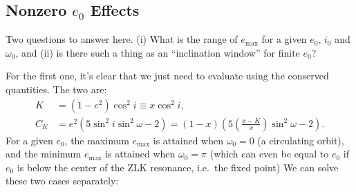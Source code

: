 \documentclass[12pt]{article}
\newcommand*{\p}[1]{\left(#1\right)}
\begin{document}
\subsection{Nonzero $e_0$ Effects}

Two questions to answer here. (i) What is the range of $e_{\max}$ for a given
$e_0$, $i_0$ and $\omega_0$, and (ii) is there such a thing as an ``inclination
window'' for finite $e_0$?

For the first one, it's clear that we just need to evaluate using the conserved
quantities. The two are:
\begin{align}
    K &= \p{1 - e^2} \cos^2i \equiv x\cos^2i,\\
    C_K
        &= e^2\p{5\sin^2i \sin^2\omega - 2}
        = \p{1 - x}\p{5\p{\frac{x - K}{x}} \sin^2\omega - 2}.
\end{align}
For a given $e_0$, the maximum $e_{\max}$ is attained when $\omega_0 = 0$ (a
circulating orbit), and the minimum $e_{\max}$ is attained when $\omega_0 = \pi$
(which can even be equal to $e_0$ if $e_0$ is below the center of the ZLK
resonance, i.e.\ the fixed point)
We can solve these two cases separately:
\end{document}
